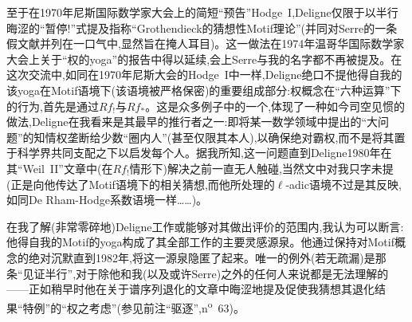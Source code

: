 至于在1970年尼斯国际数学家大会上的简短“预告”Hodge~I,Deligne仅限于以半行晦涩的“暂停!”式提及指称“Grothendieck的猜想性Motif理论”(并同对Serre的一条假文献并列在一口气中,显然旨在掩人耳目)。这一做法在1974年温哥华国际数学家大会上关于“权的yoga”的报告中得以延续,会上Serre与我的名字都不再被提及。在这次交流中,如同在1970年尼斯大会的Hodge~I中一样,Deligne绝口不提他得自我的该yoga在Motif语境下(该语境被严格保密)的重要组成部分:权概念在“六种运算”下的行为,首先是通过$Rf_!$与$Rf_*$。这是众多例子中的一个,体现了一种如今司空见惯的做法,Deligne在我看来是其最早的推行者之一:即将某一数学领域中提出的“大问题”的知情权垄断给少数“圈内人”(甚至仅限其本人),以确保绝对霸权,而不是将其置于科学界共同支配之下以启发每个人。据我所知,\dmark{}这一问题直到Deligne1980年在其“Weil~II”文章中(在$Rf_!$情形下)解决之前一直无人触碰,当然文中对我只字未提(正是向他传达了Motif语境下的相关猜想,而他所处理的$\ell$-adic语境不过是其反映,如同De Rham-Hodge系数语境一样……)。

在我了解(非常零碎地)Deligne工作或能够对其做出评价的范围内,我认为可以断言:他得自我的Motif的yoga构成了其全部工作的主要灵感源泉。他通过保持对Motif概念的绝对沉默直到1982年,将这一源泉隐匿了起来。唯一的例外(若无疏漏)是那条“见证半行”,对于除他和我(以及或许Serre)之外的任何人来说都是无法理解的——正如稍早时他在关于谱序列退化的文章中晦涩地提及促使我猜想其退化结果“特例”的“权之考虑”(参见前注“驱逐”,n\textsuperscript{o}~63)。


